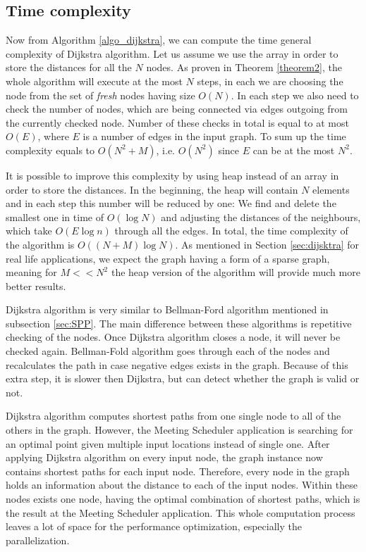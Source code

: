 \documentclass[thesis=M,english]{FITthesis}[2012/10/20]
\begin{document}
\subsection{Time complexity}
Now from Algorithm \ref{algo_dijkstra}, we can compute the time general complexity of Dijkstra algorithm. Let us assume we use the array in order to store the distances for all the $N$ nodes. As proven in Theorem \ref{theorem2}, the whole algorithm will execute at the most $N$ steps, in each we are choosing the node from the set of \textit{fresh} nodes having size $O(N)$. In each step we also need to check the number of nodes, which are being connected via edges outgoing from the currently checked node. Number of these checks in total is equal to at most $O(E)$, where $E$ is a number of edges in the input graph. To sum up the time complexity equals to $O(N^2 + M)$, i.e. $O(N^2)$ since $E$ can be at the most $N^2$.

It is possible to improve this complexity by using heap instead of an array in order to store the distances. In the beginning, the heap will contain $N$ elements and in each step this number will be reduced by one: We find and delete the smallest one in time of $O(\log{N})$ and adjusting the distances of the neighbours, which take $O(E\log{n})$ through all the edges. In total, the time complexity of the algorithm is $O((N+M) \log{N})$. As mentioned in Section \ref{sec:dijsktra} for real life applications, we expect the graph having a form of a sparse graph, meaning for $M << N^2$ the heap version of the algorithm will provide much more better results.


Dijkstra algorithm is very similar to Bellman-Ford algorithm mentioned in subsection \ref{sec:SPP}. The main difference between these algorithms is repetitive checking of the nodes. Once Dijkstra algorithm closes a node, it will never be checked again. Bellman-Fold algorithm goes through each of the nodes and recalculates the path in case negative edges exists in the graph. Because of this extra step, it is slower then Dijkstra, but can detect whether the graph is valid or not.

Dijkstra algorithm computes shortest paths from one single node to all of the others in the graph. However, the Meeting Scheduler application is searching for an optimal point given multiple input locations instead of single one. After applying Dijkstra algorithm on every input node, the graph instance now contains shortest paths for each input node. Therefore, every node in the graph holds an information about the distance to each of the input nodes. Within these nodes exists one node, having the optimal combination of shortest paths, which is the result at the Meeting Scheduler application.
This whole computation process leaves a lot of space for the performance optimization, especially the parallelization. 
\newpage
\end{document}
